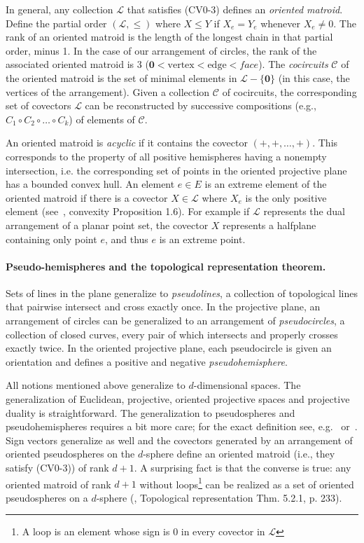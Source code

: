 \documentclass[leqno,12pt]{article}
\def\L{\mathcal{L}}
\def\C{\mathcal{C}}
\def\orig{\mathbf{0}}
\begin{document}
In general, any collection $\L$ that satisfies (CV0-3) defines an
\emph{oriented matroid}. Define the partial order $(\L,\leq)$ where
$X\leq Y$ if $X_e = Y_e$ whenever $X_e\neq 0$. The rank of an oriented
matroid is the length of the longest chain in that partial order,
minus 1. 
In the case of our arrangement of circles, the rank of the associated 
oriented matroid is 3 ($\orig < \text{vertex} < \text{edge} < {face}$).
The \emph{cocircuits} $\C$ of the oriented matroid is the set
of minimal elements in $\L-\{\orig\}$ (in this case, the
vertices of the arrangement). Given a collection $\C$ of cocircuits,
the corresponding set of covectors $\L$ can be reconstructed by
successive compositions (e.g., $C_1\circ C_2 \circ \ldots \circ C_k$) of elements of $\C$.

An oriented matroid is \emph{acyclic} if it contains the
covector $(+,+,\ldots,+)$. This corresponds to the property of all
positive hemispheres having a nonempty intersection, i.e.  the
corresponding set of points in the oriented projective plane has a
bounded convex hull.
An element $e\in E$ is an extreme element of the oriented matroid if there is a
covector $X\in\L$ where $X_e$ is the only positive 
element 
(see~\cite{Bjorner:Oriented}, convexity Proposition 1.6).
 For example if $\L$ represents the
dual arrangement of a planar point set, the covector $X$
represents a halfplane containing only point $e$, and thus $e$ is an
extreme point.   \\

\paragraph{Pseudo-hemispheres and the topological representation theorem.}
Sets of lines in the plane generalize to \emph{pseudolines}, a
collection of topological lines that pairwise intersect and cross exactly
once. In the projective plane, an arrangement of circles
can be generalized to an arrangement of \emph{pseudocircles}, a collection of
closed curves,
every pair of which
intersects and properly crosses 
exactly twice. In the oriented projective plane, each
pseudocircle is given an orientation and defines a positive and
negative \emph{pseudohemisphere}. 

All notions mentioned above generalize to $d$-dimensional spaces. The
generalization of Euclidean, projective, oriented projective spaces
and projective duality is straightforward. The generalization to
pseudospheres and pseudohemispheres requires a bit more care; for the
exact definition see, e.g.~\cite{Bjorner:Oriented} or~\cite{go-hdcg-04}. 
Sign vectors generalize as well and the covectors generated by an
arrangement of oriented pseudospheres on the $d$-sphere define an
oriented matroid (i.e., they satisfy (CV0-3)) of rank $d{+}1$. 
A surprising fact is that the converse
is true: any oriented matroid of rank $d{+}1$ without loops\footnote{A
  loop is an element whose sign is $0$ in every covector in $\L$} can
be realized as a set of oriented pseudospheres on a $d$-sphere 
(\cite{DBLP:journals/jct/FolkmanL78}, Topological representation Thm. 5.2.1, p.
233).  \\
\end{document}
